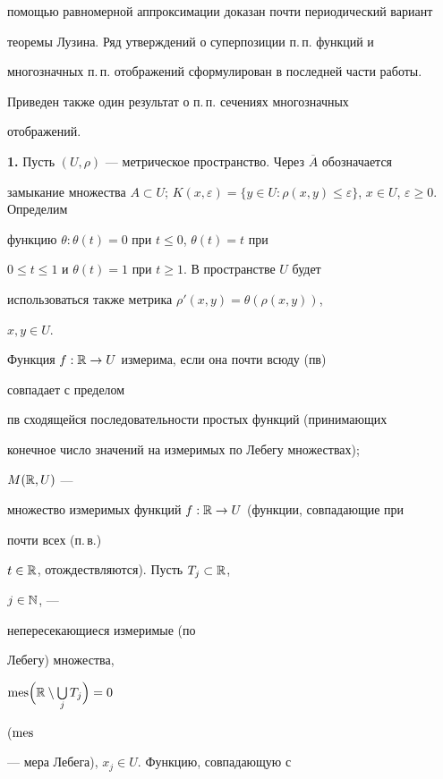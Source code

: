 помощью равномерной аппроксимации доказан почти периодический вариант


теоремы Лузина. Ряд утверждений о суперпозиции п.\,п. функций и


многозначных п.\,п. отображений сформулирован в последней части работы.


Приведен также один результат о п.\,п. сечениях многозначных


отображений.


\medskip





{\bf 1.} Пусть $(U,\rho)$ --- метрическое пространство. Через $\overline


A$ обозначается


замыкание множества $A\subset U$; $K(x,\varepsilon)=\{y\in U:


\rho(x,y)\le\varepsilon\}$, $x\in U$, $\varepsilon\ge 0$. Определим


функцию $\theta:\theta(t)=0$ при $t\le 0$, $\theta(t)=t$ при


$0\le t\le 1$ и $\theta(t)=1$ при $t\ge 1$. В пространстве $U$ будет


использоваться также метрика $\rho'(x,y)=\theta(\rho(x,y))$,


$x,y\in U$.





Функция $f:\Bbb R\to U$ измерима, если она почти всюду (пв)


совпадает с пределом


пв сходящейся последовательности простых функций (принимающих


конечное число значений на измеримых по Лебегу множествах);


$M(\Bbb R,U)$ ---


множество измеримых функций $f:\Bbb R\to U$ (функции, совпадающие при


почти всех (п.\,в.)


$t\in\Bbb R$, отождествляются). Пусть $T_j\subset\Bbb R$,


$j\in\Bbb N$, ---


непересекающиеся измеримые (по


Лебегу) множества,


$\operatorname{mes}\Bigl(\Bbb R\setminus\bigcup\limits_j T_j\Bigr)=0$


($\operatorname{mes}$


--- мера Лебега), $x_j\in U$. Функцию, совпадающую с


